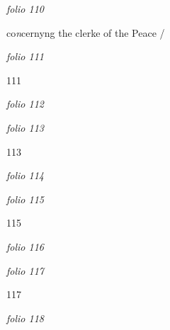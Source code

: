 \documentclass[12pt, a4paper]{book}
\begin{document}
\textit{folio 110}



		\ifthenelse{\isodd{\thepage}}
		{\reversemarginpar}
		{\normalmarginpar}
		co\textit{n}cernyng the
 clerke of the
 Peace /

\dotfill
						\newpage
{}

\textit{folio 111}


{\color{Mahogany}111}

\dotfill
						\newpage
{}

\textit{folio 112}


         \vspace*{4cm}
         
\dotfill
						

\textit{folio 113}


\begin{flushright}{\color{Mahogany}113}\end{flushright}

\dotfill
						\newpage
{}

\textit{folio 114}


         \vspace*{4cm}
         
\dotfill
						

\textit{folio 115}


\begin{flushright}{\color{Mahogany}115}\end{flushright}

\dotfill
						\newpage
{}

\textit{folio 116}


         \vspace*{4cm}
         
\dotfill
						

\textit{folio 117}


\begin{flushright}{\color{Mahogany}117}\end{flushright}

\dotfill
						\newpage
{}

\textit{folio 118}


         \vspace*{4cm}
         
\end{document}
